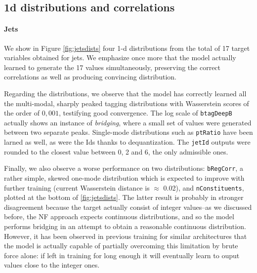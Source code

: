 \subsection{1d distributions and correlations}


\paragraph{Jets}

We show in Figure \ref{fig:jetsdists} four 1-d distributions from the total of 17 target variables obtained for jets. We emphasize once more that the model actually learned to generate the 17 values simultaneously, preserving the correct correlations as well as producing convincing distribution.

Regarding the distributions, we observe that the model has correctly learned all the multi-modal, sharply peaked tagging distributions with Wasserstein scores of the order of $0,001$, testifying good convergence. The log scale of \texttt{btagDeepB} actually shows an instance of \emph{bridging}, where a small set of values were generated between two separate peaks. Single-mode distributions such as \texttt{ptRatio} have been larned as well, as were the Ids thanks to dequantization. The \texttt{jetId} outputs were rounded to the closest value between 0, 2 and 6, the only admissible ones.

Finally, we also observe a worse performance on two distributions: \texttt{bRegCorr}, a rather simple, skewed one-mode distribution which is expected to improve with further training (current Wasserstein distance is $\approx$ 0.02), and \texttt{nConstituents}, plotted at the bottom of \ref{fig:jetsdists}. The latter result is probably in stronger disagreement because the target actually consist of integer values--as we discussed before, the NF approach expects continuous distributions, and so the model performs bridging in an attempt to obtain a reasonable continuous distribution. However, it has been observed in previous training for similar architectures that the model is actually capable of partially overcoming this limitation by brute force alone: if left in training for long enough it will eventually learn to ouput values close to the integer ones.

